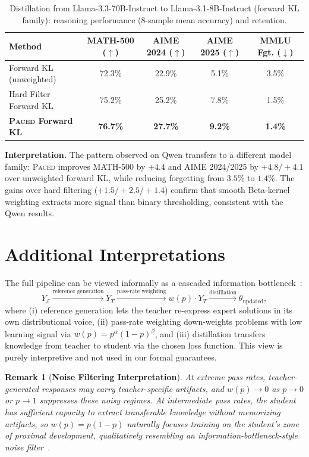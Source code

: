 \documentclass{article}
\newtheorem{remark}{Remark}
\newcommand{\mstd}[2]{#1\if\relax\detokenize{#2}\relax\else{$\scriptstyle\,\pm\,#2$}\fi\%}
\begin{document}
\begin{table}[h]
\caption{Distillation from Llama-3.3-70B-Instruct to Llama-3.1-8B-Instruct (forward KL family): reasoning performance (8-sample mean accuracy) and retention.}
\centering
\begin{tabular}{lcccc}
\toprule
\textbf{Method} & \textbf{MATH-500} ($\uparrow$) & \textbf{AIME 2024} ($\uparrow$) & \textbf{AIME 2025} ($\uparrow$) & \textbf{MMLU Fgt.} ($\downarrow$) \\
\midrule 
Forward KL (unweighted) & \mstd{72.3}{} & \mstd{22.9}{} & \mstd{5.1}{} & 3.5\% \\
Hard Filter Forward KL & \mstd{75.2}{} & \mstd{25.2}{} & \mstd{7.8}{} & 1.5\% \\
\textbf{\textsc{Paced} Forward KL} & \textbf{\mstd{76.7}{}} & \textbf{\mstd{27.7}{}} & \textbf{\mstd{9.2}{}} & \textbf{1.4\%} \\
\bottomrule
\end{tabular}
\label{tab:llama_self}
\end{table}

\textbf{Interpretation.} The pattern observed on Qwen transfers to a different model family: \textsc{Paced} improves MATH-500 by $+4.4$ and AIME 2024/2025 by $+4.8/+4.1$ over unweighted forward KL, while reducing forgetting from $3.5\%$ to $1.4\%$. The gains over hard filtering ($+1.5/+2.5/+1.4$) confirm that smooth Beta-kernel weighting extracts more signal than binary thresholding, consistent with the Qwen results.

\section{Additional Interpretations}
\label{app:connections}
\label{app:ib_connection}

The full pipeline can be viewed informally as a cascaded information bottleneck~\citep{tishby2000ib}:
\begin{equation}
  Y_{\mathcal{E}} \xrightarrow{\text{reference generation}} Y_T \xrightarrow{\text{pass-rate weighting}} w(p) \cdot Y_T \xrightarrow{\text{distillation}} \theta_{\text{updated}},
\end{equation}
where (i) reference generation lets the teacher re-express expert solutions in its own distributional voice, (ii) pass-rate weighting down-weights problems with low learning signal via $w(p) = p^\alpha(1-p)^\beta$, and (iii) distillation transfers knowledge from teacher to student via the chosen loss function. This view is purely interpretive and not used in our formal guarantees.
\begin{remark}[\textbf{Noise Filtering Interpretation}]
\label{rem:cascade}
At extreme pass rates, teacher-generated responses may carry teacher-specific artifacts, and $w(p) \to 0$ as $p \to 0$ or $p \to 1$ suppresses these noisy regimes. At intermediate pass rates, the student has sufficient capacity to extract transferable knowledge without memorizing artifacts, so $w(p) = p(1-p)$ naturally focuses training on the student's zone of proximal development, qualitatively resembling an information-bottleneck-style noise filter~\citep{tishby2000ib}.
\end{remark}
\end{document}
